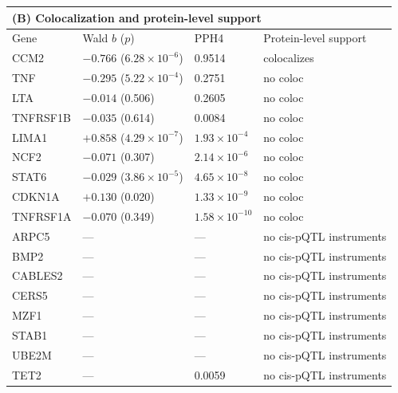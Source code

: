 \begin{table}[htbp]
\begin{tabular}{llll}
\toprule
\multicolumn{4}{l}{\textbf{(B)} Colocalization and protein-level support}\\
\midrule
  Gene & Wald $b$ ($p$) & PPH4 & Protein-level support \\
\midrule
  CCM2      & $-0.766$ ($6.28\times10^{-6}$) & 0.9514              & colocalizes \\
  TNF       & $-0.295$ ($5.22\times10^{-4}$) & 0.2751              & no coloc \\
  LTA       & $-0.014$ (0.506)               & 0.2605              & no coloc \\
  TNFRSF1B  & $-0.035$ (0.614)               & 0.0084              & no coloc \\
  LIMA1     & $+0.858$ ($4.29\times10^{-7}$) & $1.93\times10^{-4}$ & no coloc \\
  NCF2      & $-0.071$ (0.307)               & $2.14\times10^{-6}$ & no coloc \\
  STAT6     & $-0.029$ ($3.86\times10^{-5}$) & $4.65\times10^{-8}$ & no coloc \\
  CDKN1A    & $+0.130$ (0.020)               & $1.33\times10^{-9}$ & no coloc \\
  TNFRSF1A  & $-0.070$ (0.349)               & $1.58\times10^{-10}$ & no coloc \\
  ARPC5     & --- & --- & no cis-pQTL instruments \\
  BMP2      & --- & --- & no cis-pQTL instruments \\
  CABLES2   & --- & --- & no cis-pQTL instruments \\
  CERS5     & --- & --- & no cis-pQTL instruments \\
  MZF1      & --- & --- & no cis-pQTL instruments \\
  STAB1     & --- & --- & no cis-pQTL instruments \\
  UBE2M     & --- & --- & no cis-pQTL instruments \\
  TET2      & --- & 0.0059 & no cis-pQTL instruments \\
\bottomrule
\end{tabular}


\end{table}
